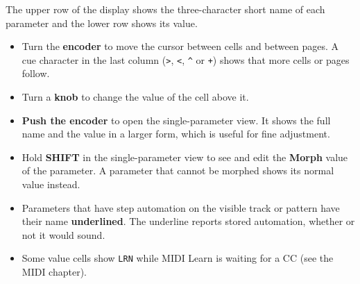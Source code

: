 The upper row of the display shows the three-character short name of
each parameter and the lower row shows its value.


\begin{itemize}
\tightlist
\item
  Turn the \textbf{encoder} to move the cursor between cells and between
  pages. A cue character in the last column (\texttt{\textgreater{}},
  \texttt{\textless{}}, \texttt{\^{}} or \texttt{+}) shows that more
  cells or pages follow.
\item
  Turn a \textbf{knob} to change the value of the cell above it.
\item
  \textbf{Push the encoder} to open the single-parameter view. It shows
  the full name and the value in a larger form, which is useful for fine
  adjustment.
\end{itemize}


\begin{itemize}
\tightlist
\item
  Hold \textbf{SHIFT} in the single-parameter view to see and edit the
  \textbf{Morph} value of the parameter. A parameter that cannot be
  morphed shows its normal value instead.
\item
  Parameters that have step automation on the visible track or pattern
  have their name \textbf{underlined}. The underline reports stored
  automation, whether or not it would sound.
\item
  Some value cells show \texttt{LRN} while MIDI Learn is waiting for a
  CC (see the MIDI chapter).
\end{itemize}

